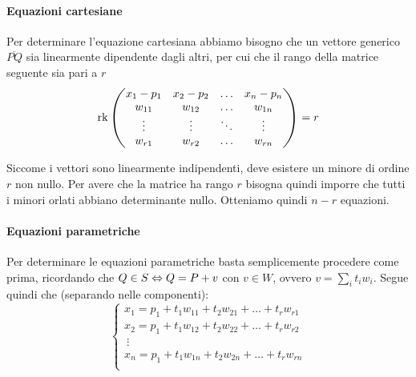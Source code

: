 \documentclass{article}     %
\begin{document}
\begin{ex}[Generalizziano l'esempio seguente considerando lo spazio affine $\A$ di dimensione $n$ con il sistema di riferimento canonico e scriviamo le equazioni del sottospazio affine $S$ passante per $P=(p_1, \dots, p_n)$ con giacitura $W=\langle w_1,\dots, w_r\rangle$, dove $w_i=(w_{i1},\dots,w_{in})$ e i $w_i$ sono linearmente indipendenti.]
\paragraph*{Equazioni cartesiane}
Per determinare l'equazione cartesiana abbiamo bisogno che un vettore generico $\overline{PQ}$ sia linearmente dipendente dagli altri, per cui che il rango della matrice seguente sia pari a $r$
\[\operatorname{rk}\begin{pmatrix}
    x_1-p_1&x_2-p_2&\dots&x_n-p_n\\
    w_{11}&w_{12} & \dots & w_{1n}\\
    \vdots&\vdots&\ddots&\vdots\\
    w_{r1}&w_{r2} & \dots & w_{rn}\\
\end{pmatrix}=r\]

Siccome i vettori sono linearmente indipendenti, deve esistere un minore di ordine $r$ non nullo. Per avere che la matrice ha rango $r$ bisogna quindi imporre che tutti i minori orlati abbiano determinante nullo. Otteniamo quindi $n-r$ equazioni.
\paragraph*{Equazioni parametriche}
Per determinare le equazioni parametriche basta semplicemente procedere come prima, ricordando che $Q\in S \Leftrightarrow Q=P+v $ con $v\in W$, ovvero $v=\sum_it_iw_i$. Segue quindi che (separando nelle componenti):
\[\begin{cases}
    x_1=p_1+t_1w_{11}+t_2w_{21}+\dots+t_rw_{r1}\\
    x_2=p_1+t_1w_{12}+t_2w_{22}+\dots+t_rw_{r2}\\
    \ \vdots\\
    x_n=p_1+t_1w_{1n}+t_2w_{2n}+\dots+t_rw_{rn}\\
\end{cases}\]
\end{ex}


\newpage
\end{document}

